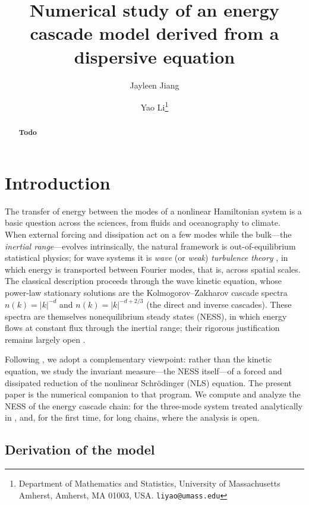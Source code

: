\documentclass[11pt,a4paper]{article}
\title{Numerical study of an energy cascade model derived from a dispersive equation}
\author{Jayleen Jiang \and Yao Li\thanks{Department of Mathematics and Statistics, University of Massachusetts Amherst, Amherst, MA 01003, USA. \texttt{liyao@umass.edu}}}
\date{}
\theoremstyle{definition}
\numberwithin{equation}{section}   %
\begin{document}
\maketitle

\begin{abstract}
\textbf{Todo}
\end{abstract}


\section{Introduction}

The transfer of energy between the modes of a nonlinear Hamiltonian system is a
basic question across the sciences, from fluids and oceanography to climate.
When external forcing and dissipation act on a few modes while the bulk---the
\emph{inertial range}---evolves intrinsically, the natural framework is
out-of-equilibrium statistical physics; for wave systems it is \emph{wave} (or
\emph{weak}) \emph{turbulence theory} \cite{Nazarenko}, in which energy is
transported between Fourier modes, that is, across spatial scales. The classical
description proceeds through the wave kinetic equation, whose power-law
stationary solutions are the Kolmogorov--Zakharov cascade spectra
$n(k)=|k|^{-d}$ and $n(k)=|k|^{-d+2/3}$ (the direct and inverse cascades). These
spectra are themselves nonequilibrium steady states (NESS), in which energy
flows at constant flux through the inertial range; their rigorous justification
remains largely open \cite{HLNS}.

Following \cite{HLNS}, we adopt a complementary viewpoint: rather than the
kinetic equation, we study the invariant measure---the NESS itself---of a
forced and dissipated reduction of the nonlinear Schr\"odinger (NLS) equation.
The present paper is the numerical companion to that program. We compute and
analyze the NESS of the energy cascade chain: for the three-mode system treated
analytically in \cite{HLNS}, and, for the first time, for long chains, where the
analysis is open.

\subsection{Derivation of the model}\label{sec:derivation}
\end{document}
